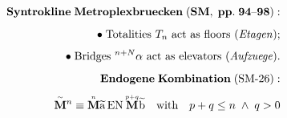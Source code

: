 \documentclass[preview]{standalone}
\begin{document}
\begin{align*}
\special{dvisvgm:raw <g id='unique000'>}\mathbf{Syntrokline\;Metroplexbruecken\;(SM,\;pp.\;94\text{--}98):}\\[5pt]\bullet\;\text{Totalities }T_n\text{ act as floors (\textit{Etagen});}\\[3pt]\bullet\;\text{Bridges }{}^{n+N}\alpha\text{ act as elevators (\textit{Aufzuege}).}\\[5pt]\mathbf{Endogene\;Kombination\;(\text{SM-26}):}\\[3pt]\overset{\scriptscriptstyle\sim}{\mathbf{M}}{}^n \equiv \overset{\scriptscriptstyle n}{\mathbf{M}}\widetilde{\mathrm{a}}\,\mathrm{EN}\,\overset{\scriptscriptstyle p+q}{\mathbf{M}}\widetilde{\mathrm{b}} \quad\text{with}\quad p + q \le n \;\wedge\; q > 0\special{dvisvgm:raw </g>}
\end{align*}
\end{document}
